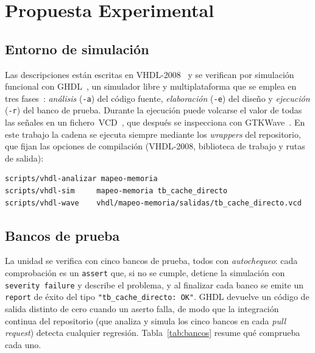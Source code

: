 \documentclass[llncs]{llncs}
\begin{document}
\section{Propuesta Experimental}
\label{sec:propuesta}

\subsection{Entorno de simulación}

Las descripciones están escritas en VHDL-2008~\cite{ieee1076} y se
verifican por simulación funcional con GHDL~\cite{ghdl-docs}, un
simulador libre y multiplataforma que se emplea en tres
fases~\cite{ghdl-invoking}: \emph{análisis} (\texttt{-a}) del código
fuente, \emph{elaboración} (\texttt{-e}) del diseño y \emph{ejecución}
(\texttt{-r}) del banco de prueba. Durante la ejecución puede volcarse
el valor de todas las señales en un fichero~VCD~\cite{ghdl-simulation},
que después se inspecciona con GTKWave~\cite{gtkwave-docs}. En este
trabajo la cadena se ejecuta siempre mediante los \emph{wrappers} del
repositorio, que fijan las opciones de compilación (VHDL-2008,
biblioteca de trabajo y rutas de salida):

\begin{lstlisting}[style=shell]
scripts/vhdl-analizar mapeo-memoria
scripts/vhdl-sim     mapeo-memoria tb_cache_directo
scripts/vhdl-wave    vhdl/mapeo-memoria/salidas/tb_cache_directo.vcd
\end{lstlisting}

\subsection{Bancos de prueba}

La unidad se verifica con cinco bancos de prueba, todos con
\emph{autochequeo}: cada comprobación es un \texttt{assert} que, si no
se cumple, detiene la simulación con \texttt{severity failure} y
describe el problema, y al finalizar cada banco se emite un
\texttt{report} de éxito del tipo
\texttt{"tb\_cache\_directo:\ OK"}. GHDL devuelve un código de salida
distinto de cero cuando un aserto falla, de modo que la integración
continua del repositorio (que analiza y simula los cinco bancos en
cada \emph{pull request}) detecta cualquier regresión.
Tabla~\ref{tab:bancos} resume qué comprueba cada uno.
\end{document}
